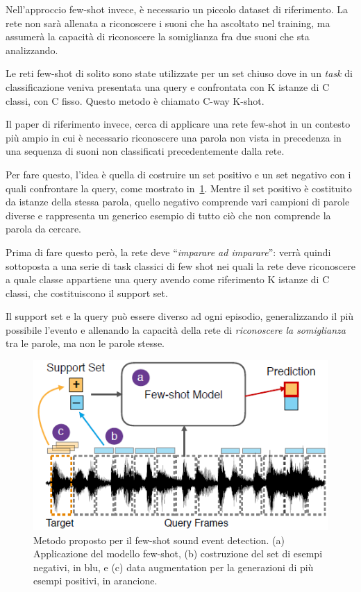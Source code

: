 \documentclass[12pt,a4paper,titlepage]{article}
\begin{document}
Nell'approccio few-shot invece, è necessario un piccolo dataset di riferimento. La rete non sarà allenata a riconoscere i suoni che ha ascoltato nel training, ma assumerà la capacità di riconoscere la somiglianza fra due suoni che sta analizzando.

Le reti few-shot di solito sono state utilizzate per un set chiuso dove in un \textit{task} di classificazione veniva presentata una query e confrontata con K istanze di C classi, con C fisso.
Questo metodo è chiamato C-way K-shot.

Il paper di riferimento invece, cerca di applicare una rete few-shot in un contesto più ampio in cui è necessario riconoscere una parola non vista in precedenza in una sequenza di suoni non classificati precedentemente dalla rete.

Per fare questo, l'idea è quella di costruire un set positivo e un set negativo con i quali confrontare la query, come mostrato in~\ref{fig:few_shot_sound_event_detection_method}. Mentre il set positivo è costituito da istanze della stessa parola, quello negativo comprende vari campioni di parole diverse e rappresenta un generico esempio di tutto ciò che non comprende la parola da cercare.

Prima di fare questo però, la rete deve ``\textit{imparare ad imparare}'': verrà quindi sottoposta a una serie di task classici di few shot nei quali la rete deve riconoscere a quale classe appartiene una query avendo come riferimento K istanze di C classi, che costituiscono il support set.

Il support set e la query può essere diverso ad ogni episodio, generalizzando il più possibile l'evento e allenando la capacità della rete di \textit{riconoscere la somiglianza} tra le parole, ma non le parole stesse.


\begin{figure}[h]
	\centering	
	\includegraphics[width=.5\textwidth]{Immagini/few_shot_sound_event_detection_method}
	\caption{Metodo proposto per il few-shot sound event detection. (a) Applicazione del modello few-shot, (b) costruzione del set di esempi negativi, in blu, e (c) data augmentation per la generazioni di più esempi positivi, in arancione.~\cite{Salamon:Few-Shot}}
	\label{fig:few_shot_sound_event_detection_method}
\end{figure}
\end{document}
